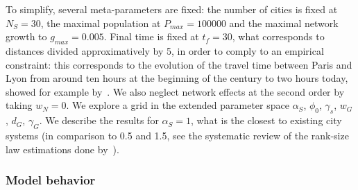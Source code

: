 \documentclass[11pt]{article}
\begin{document}
To simplify, several meta-parameters are fixed: the number of cities is fixed at $N_S = 30$, the maximal population at $P_{max} = 100000$ and the maximal network growth to $g_{max} = 0.005$. Final time is fixed at $t_f = 30$, what corresponds to distances divided approximatively by 5, in order to comply to an empirical constraint: this corresponds to the evolution of the travel time between Paris and Lyon from around ten hours at the beginning of the century to two hours today, showed for example by~\cite{thevenin2013mapping}. We also neglect network effects at the second order by taking $w_N = 0$. We explore a grid in the extended parameter space $\alpha_S$, $\phi_0$, $\gamma_s$, $w_G$, $d_G$, $\gamma_G$. We describe the results for $\alpha_S = 1$, what is the closest to existing city systems (in comparison to 0.5 and 1.5, see the systematic review of the rank-size law estimations done by~\cite{10.1371/journal.pone.0183919}).


\subsubsection{Model behavior}
\end{document}
